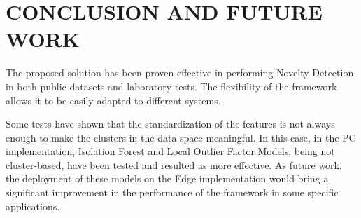 \section{CONCLUSION AND FUTURE WORK}

The proposed solution has been proven effective in performing Novelty Detection in both public datasets and laboratory tests. The flexibility of the framework allows it to be easily adapted to different systems. 

Some tests have shown that the standardization of the features is not always enough to make the clusters in the data space meaningful. In this case, in the PC implementation, Isolation Forest and Local Outlier Factor Models, being not cluster-based, have been tested and resulted as more effective. As future work, the deployment of these models on the Edge implementation would bring a significant improvement in the performance of the framework in some specific applications.